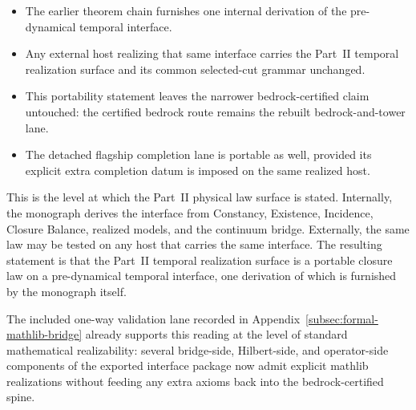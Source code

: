 \begin{tcolorbox}[colback=white, colframe=black!70, title={Portability Claim of This Chapter}]
\begin{itemize}[itemsep=0.2em, leftmargin=1.5em]
\item The earlier theorem chain furnishes one internal derivation of the
      pre-dynamical temporal interface.
\item Any external host realizing that same interface carries the Part~II
      temporal realization surface and its common selected-cut grammar
      unchanged.
\item This portability statement leaves the narrower bedrock-certified claim
      untouched: the certified bedrock route remains the rebuilt
      bedrock-and-tower lane.
\item The detached flagship completion lane is portable as well, provided its
      explicit extra completion datum is imposed on the same realized host.
\end{itemize}
\end{tcolorbox}

This is the level at which the Part~II physical law surface is stated.
Internally, the monograph derives the interface from Constancy, Existence,
Incidence, Closure Balance, realized models, and the continuum bridge.
Externally, the same law may be tested on any host that carries the same
interface. The resulting statement is that the Part~II temporal realization
surface is a portable closure law on a pre-dynamical temporal interface, one
derivation of which is furnished by the monograph itself.

The included one-way validation lane recorded in
Appendix~\ref{subsec:formal-mathlib-bridge} already supports this reading at
the level of standard mathematical realizability: several bridge-side,
Hilbert-side, and operator-side components of the exported interface package
now admit explicit mathlib realizations without feeding any extra axioms back
into the bedrock-certified spine.
